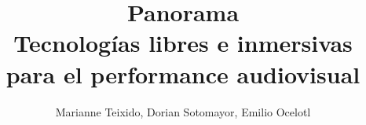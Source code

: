 \documentclass[12pt,letterpaper,draft, twocolumn]{article}
\author{Marianne Teixido, Dorian Sotomayor, Emilio Ocelotl}
\title{%
  Panorama \\
  \large Tecnologías libres e inmersivas para el performance audiovisual}
\begin{document}
\maketitle

\begin{abstract}

  
  
\end{abstract}










\theendnotes %

\nocite{interactiveDigitalMusic}
\nocite{speakingCode}

%
{}

\end{document}
